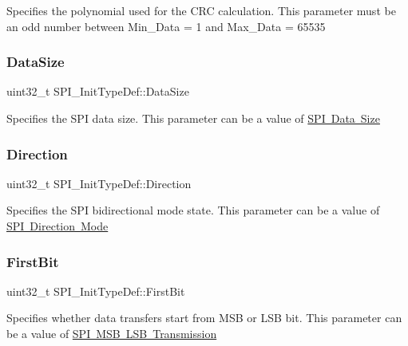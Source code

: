 Specifies the polynomial used for the C\+RC calculation. This parameter must be an odd number between Min\+\_\+\+Data = 1 and Max\+\_\+\+Data = 65535 \mbox{\label{struct_s_p_i___init_type_def_a24b7835dd877e1c4e55236303fa3387f}} 
\subsubsection{\texorpdfstring{DataSize}{DataSize}}
{\footnotesize\ttfamily uint32\+\_\+t S\+P\+I\+\_\+\+Init\+Type\+Def\+::\+Data\+Size}

Specifies the S\+PI data size. This parameter can be a value of \mbox{\hyperlink{group___s_p_i___data___size}{S\+PI Data Size}} \mbox{\label{struct_s_p_i___init_type_def_ae5c132f597c806d7a1fe316023b36867}} 
\subsubsection{\texorpdfstring{Direction}{Direction}}
{\footnotesize\ttfamily uint32\+\_\+t S\+P\+I\+\_\+\+Init\+Type\+Def\+::\+Direction}

Specifies the S\+PI bidirectional mode state. This parameter can be a value of \mbox{\hyperlink{group___s_p_i___direction}{S\+PI Direction Mode}} \mbox{\label{struct_s_p_i___init_type_def_a8c541d8863cb62a3212b9381b5cba447}} 
\subsubsection{\texorpdfstring{FirstBit}{FirstBit}}
{\footnotesize\ttfamily uint32\+\_\+t S\+P\+I\+\_\+\+Init\+Type\+Def\+::\+First\+Bit}

Specifies whether data transfers start from M\+SB or L\+SB bit. This parameter can be a value of \mbox{\hyperlink{group___s_p_i___m_s_b___l_s_b__transmission}{S\+PI M\+SB L\+SB Transmission}} \mbox{\label{struct_s_p_i___init_type_def_a5247eb0463437c9980a9d4a5300b50a5}} 
